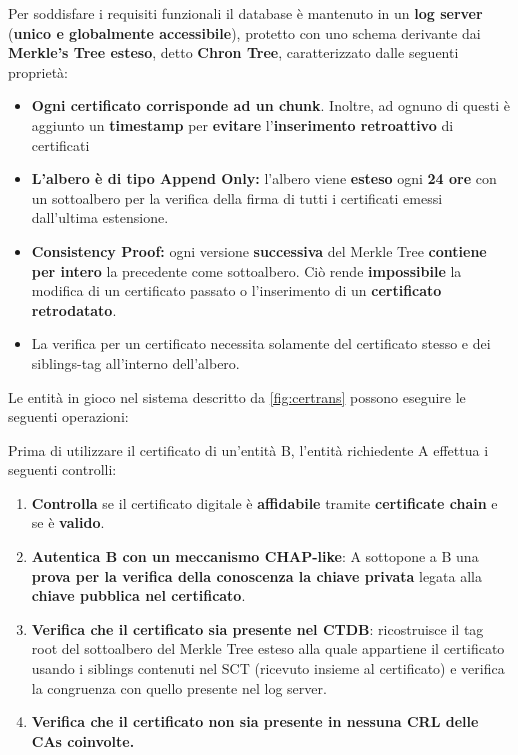 Per soddisfare i requisiti funzionali il database è mantenuto in un \textbf{log server} (\textbf{unico e globalmente accessibile}), protetto
con uno schema derivante dai \textbf{Merkle's Tree esteso}, detto \textbf{Chron Tree}, caratterizzato dalle seguenti proprietà:
\begin{proposition}
\begin{itemize}
    \item \textbf{Ogni certificato corrisponde ad un chunk}. Inoltre, ad ognuno di questi è aggiunto un \textbf{timestamp} per \textbf{evitare} l'\textbf{inserimento retroattivo} di certificati
    \item \textbf{L'albero è di tipo Append Only:} l'albero viene \textbf{esteso} ogni \textbf{24 ore} con un sottoalbero per la verifica della firma di tutti i certificati emessi dall'ultima estensione.
    \item \textbf{Consistency Proof:} ogni versione \textbf{successiva} del Merkle Tree \textbf{contiene per intero} la precedente come sottoalbero. Ciò rende \textbf{impossibile} la modifica di un certificato passato o l'inserimento di un \textbf{certificato retrodatato}.
    \item La verifica per un certificato necessita solamente del certificato stesso e dei siblings-tag all'interno dell'albero.
\end{itemize}
\end{proposition}
Le entità in gioco nel sistema descritto da \cref{fig:certrans} possono eseguire le seguenti operazioni:
\begin{proposition}
Prima di utilizzare il certificato di un'entità B, l'entità richiedente A effettua i seguenti controlli:
\begin{enumerate}
    \item \textbf{Controlla} se il certificato digitale è \textbf{affidabile} tramite \textbf{certificate chain} e se è \textbf{valido}.
    \item\textbf{ Autentica B con un meccanismo CHAP-like}: A sottopone a B una \textbf{prova per la verifica della conoscenza la chiave privata} legata alla\textbf{ chiave pubblica nel certificato}.
    \item \textbf{Verifica che il certificato sia presente nel CTDB}: ricostruisce il tag root del sottoalbero del Merkle Tree esteso alla quale appartiene il certificato usando i siblings contenuti nel SCT (ricevuto insieme al certificato) e verifica la congruenza con quello presente nel log server.
    \item \textbf{Verifica che il certificato non sia presente in nessuna CRL delle CAs coinvolte.}
\end{enumerate}
\end{proposition}\pagebreak

